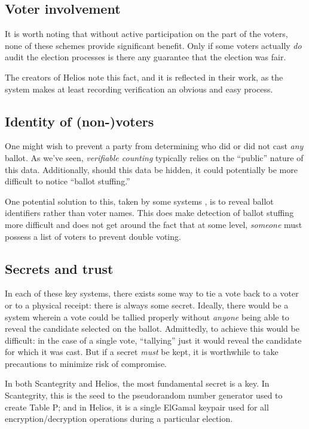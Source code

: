 \documentclass[10pt]{article}
\newcommand{\term}[1]{\textit{#1}}
\begin{document}
\begin{multicols}{2}
\subsection{Voter involvement}

It is worth noting that without active participation on the part of the voters, none of these
schemes provide significant benefit. Only if some voters actually \emph{do} audit the election
processes is there any guarantee that the election was fair.

The creators of Helios note this fact, and it is reflected in their work, as the system makes at
least recording verification an obvious and easy process.

\subsection{Identity of (non-)voters}

One might wish to prevent a party from determining who did or did not cast \emph{any} ballot.
As we've seen, \term{verifiable counting} typically relies on the ``public'' nature of this data.
Additionally, should this data be hidden, it could potentially be more difficult to notice ``ballot
stuffing.''

One potential solution to this, taken by some systems \cite{preta}, is to reveal ballot identifiers
rather than voter names. This does make detection of ballot stuffing more difficult and does not get
around the fact that at some level, \emph{someone} must possess a list of voters to prevent double
voting.

\subsection{Secrets and trust}

In each of these key systems, there exists some way to tie a vote back to a voter or to a physical
receipt: there is always some secret. Ideally, there would be a system wherein a vote could be
tallied properly without \emph{anyone} being able to reveal the candidate selected on the ballot.
Admittedly, to achieve this would be difficult: in the case of a single vote, ``tallying'' just it
would reveal the candidate for which it was cast. But if a secret \emph{must} be kept, it is
worthwhile to take precautions to minimize risk of compromise.

In both Scantegrity and Helios, the most fundamental secret is a key. In Scantegrity, this is the
seed to the pseudorandom number generator used to create Table P; and in Helios, it is a single
ElGamal keypair used for all encryption/decryption operations during a particular election.


\end{multicols}
\end{document}
